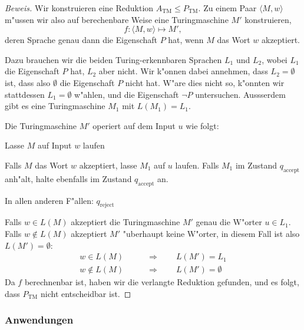 \begin{proof}[Beweis]
Wir konstruieren eine Reduktion $A_\text{TM}\le P_{\text{TM}}$.
Zu einem Paar
$\langle M,w\rangle$
m"ussen wir also auf
berechenbare Weise eine Turingmaschine
$M'$ konstruieren,
\[
f\colon \langle M,w\rangle\mapsto M',
\]
deren Sprache genau dann die Eigenschaft $P$
hat, wenn $M$ das Wort $w$ akzeptiert.

Dazu brauchen wir die beiden Turing-erkennbaren Sprachen $L_1$ und $L_2$,
wobei $L_1$ die Eigenschaft $P$ hat, $L_2$ aber nicht.
Wir k"onnen dabei annehmen, dass $L_2=\emptyset$ ist, dass also
$\emptyset$ die Eigenschaft $P$ nicht hat. W"are dies nicht so, k"onnten
wir stattdessen $L_1=\emptyset$  w"ahlen, und die Eigenschaft $\neg P$
untersuchen. Aussserdem gibt es eine Turingmaschine $M_1$ mit $L(M_1)=L_1$.

Die Turingmaschine $M'$ operiert auf dem Input $u$ wie folgt:
\medskip
\begin{compactenum}
\item Lasse $M$ auf Input $w$ laufen
\item Falls $M$ das Wort $w$ akzeptiert, lasse $M_1$ auf $u$ laufen.
Falls $M_1$ im Zustand $q_{\text{accept}}$ anh"alt, halte ebenfalls
im Zustand $q_{\text{accept}}$ an.
\item In allen anderen F"allen: $q_{\text{reject}}$
\end{compactenum}
\medskip

Falls $w\in L(M)$ akzeptiert die Turingmaschine $M'$ genau die W"orter
$u\in L_1$. Falls $w\not\in L(M)$ akzeptiert $M'$ "uberhaupt keine
W"orter, in diesem Fall ist also $L(M')=\emptyset$:
\begin{align*}
w\in L(M)&\qquad \Rightarrow\qquad L(M')=L_1\\
w\not\in L(M)&\qquad \Rightarrow\qquad L(M')=\emptyset
\end{align*}
Da $f$ berechnenbar ist, haben wir die verlangte Reduktion
gefunden, und es folgt, dass $P_{\text{TM}}$ nicht
entscheidbar ist.
\end{proof}

\subsubsection{Anwendungen}

